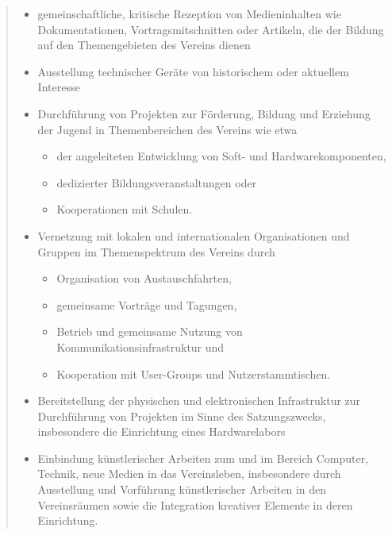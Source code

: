\documentclass{scrartcl}
\begin{document}
\begin{quote}
\begin{enumerate}
\begin{itemize}
		\item gemeinschaftliche, kritische Rezeption von Medieninhalten
			wie Dokumentationen, Vortragsmitschnitten oder Artikeln, die der
			Bildung auf den Themengebieten des Vereins dienen

		\item Ausstellung technischer Geräte von historischem oder aktuellem
			Interesse

		\item Durchführung von Projekten zur Förderung, Bildung und Erziehung
			der Jugend in Themenbereichen des Vereins wie etwa
			\begin{itemize}
				\item der angeleiteten Entwicklung von Soft- und Hardwarekomponenten,
				\item dedizierter Bildungsveranstaltungen oder
				\item Kooperationen mit Schulen.
		\end{itemize}

		\item Vernetzung mit lokalen und internationalen Organisationen und
			Gruppen im Themenspektrum des Vereins durch
			\begin{itemize}
				\item Organisation von Austauschfahrten,
				\item gemeinsame Vorträge und Tagungen,
				\item Betrieb und gemeinsame Nutzung von
					Kommunikationsinfrastruktur und
				\item Kooperation mit User-Groups und Nutzerstammtischen.
			\end{itemize}

		\item Bereitstellung der physischen und elektronischen Infrastruktur zur
			Durchführung von Projekten im Sinne des Satzungszwecks,
			insbesondere die Einrichtung eines Hardwarelabors

		\item Einbindung künstlerischer Arbeiten zum und im Bereich Computer,
			Technik, neue Medien in das Vereinsleben, insbesondere durch
			Ausstellung und Vorführung künstlerischer Arbeiten in den
			Vereinsräumen sowie die Integration kreativer Elemente in
			deren Einrichtung.
	\end{itemize}
\end{enumerate}

\end{quote}
\end{document}
